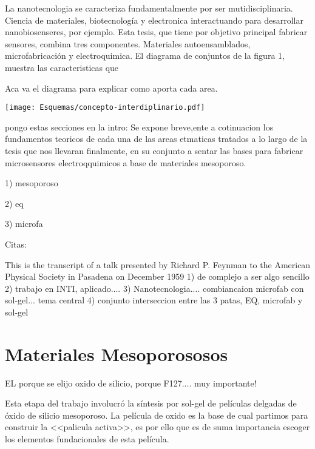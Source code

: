 La nanotecnologia se caracteriza fundamentalmente por ser mutidisciplinaria. Ciencia de materiales, biotecnología y electronica interactuando para desarrollar nanobiosenseres, por ejemplo. Esta tesis, que tiene por objetivo principal fabricar sensores, combina tres componentes. Materiales autoensamblados, microfabricación y electroquimica. 
El diagrama de conjuntos de la figura 1, muestra las caracteristicas que 

Aca va el diagrama para explicar como aporta cada area.


\begin{center}
	\texttt{[image: Esquemas/concepto-interdiplinario.pdf]}
\end{center}

 
pongo estas secciones en la intro:
Se expone breve,ente a cotinuacion los fundamentos teoricos de cada una de las areas etmaticas tratados a lo largo de la tesis que nos llevaran finalmente, en su conjunto a sentar las bases para fabricar microsensores electroqquimicos a base de materiales mesoporoso.

1) mesoporoso

2) eq

3) microfa

Citas:


This is the transcript of a talk presented by Richard P. Feynman to the American Physical Society
in Pasadena on December 1959
1) de complejo a ser algo sencillo \\
2) trabajo en INTI, aplicado....
3) Nanotecnologia.... combiancaion microfab con sol-gel... tema central
4) conjunto interseccion entre las 3 patas, EQ, microfab y sol-gel

\section{Materiales Mesoporososos}\label{sec:mesoporosos}

				EL porque se elijo oxido de silicio, porque F127.... muy importante!
				
				Esta etapa del trabajo involucró la síntesis por sol-gel de películas delgadas de óxido de silicio mesoporoso. La película de oxido es la base de cual partimos para construir la <<palicula activa>>, es por ello que es de suma importancia escoger los elementos fundacionales de esta película. \cite{Soler-Illia2002a,Brinker1999,Soler-Illia2006,Grosso2004,Innocenzi2013}



